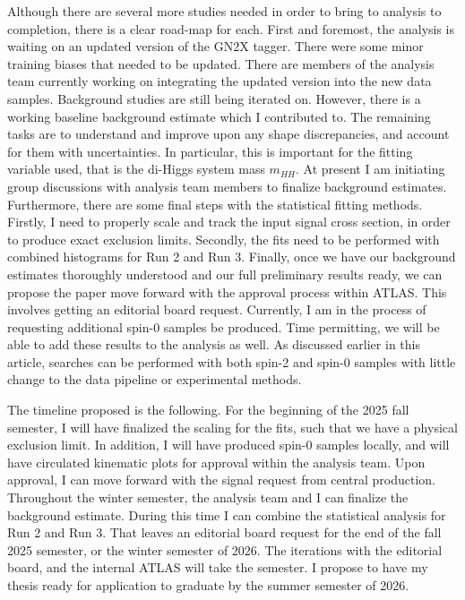\documentclass[12pt]{article}
\begin{document}
Although there are several more studies needed in order to bring to analysis to
completion, there is a clear road-map for each. First and foremost, the analysis
is waiting on an updated version of the GN2X tagger. There were some minor
training biases that needed to be updated. There are members of the analysis
team currently working on integrating the updated version into the new data
samples. Background studies are still being iterated on. However, there is a
working baseline background estimate which I contributed to. The remaining tasks
are to understand and improve upon any shape discrepancies, and account for them
with uncertainties. In particular, this is important for the fitting variable
used, that is the di-Higgs system mass $m_{HH}$. At present I am initiating
group discussions with analysis team members to finalize background estimates.
Furthermore, there are some final steps with the statistical fitting methods.
Firstly, I need to properly scale and track the input signal cross section, in
order to produce exact exclusion limits. Secondly, the fits need to be performed
with combined histograms for Run 2 and Run 3. Finally, once we have our
background estimates thoroughly understood and our full preliminary results
ready, we can propose the paper move forward with the approval process within
ATLAS. This involves getting an editorial board request. Currently, I am in the
process of requesting additional spin-0 samples be produced. Time permitting, we
will be able to add these results to the analysis as well. As discussed earlier
in this article, searches can be performed with both spin-2 and spin-0 samples
with little change to the data pipeline or experimental methods.

The timeline proposed is the following. For the beginning of the 2025 fall
semester, I will have finalized the scaling for the fits, such that we have a
physical exclusion limit. In addition, I will have produced spin-0 samples
locally, and will have circulated kinematic plots for approval within the
analysis team. Upon approval, I can move forward with the signal request from
central production. Throughout the winter semester, the analysis team and I can
finalize the background estimate. During this time I can combine the statistical
analysis for Run 2 and Run 3. That leaves an editorial board request for the end
of the fall 2025 semester, or the winter semester of 2026. The iterations with
the editorial board, and the internal ATLAS will take the semester. I propose to
have my thesis ready for application to graduate by the summer semester of 2026.
\end{document}
